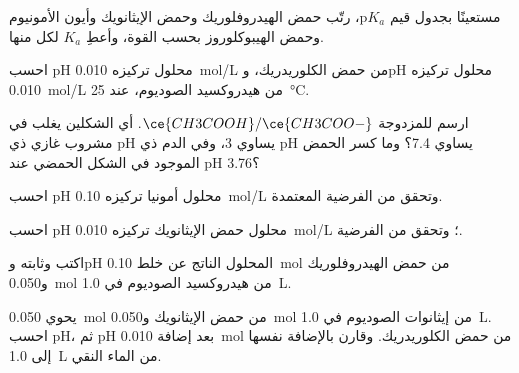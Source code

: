 \begin{exercise}[$\star$]\label{exo:b1:predominant-reaction:2}
مستعينًا بجدول قيم $\mathrm{p}K_a$، رتّب حمض الهيدروفلوريك وحمض الإيثانويك
وأيون الأمونيوم وحمض الهيبوكلوروز بحسب القوة، وأعطِ $K_a$ لكل
منها.
\end{exercise}

\begin{exercise}[$\star$]\label{exo:b1:predominant-reaction:3}
احسب pH محلول تركيزه \qty{0.010}{mol/L} من حمض الكلوريدريك،
وpH محلول تركيزه \qty{0.010}{mol/L} من هيدروكسيد الصوديوم، عند
\qty{25}{\celsius}.
\end{exercise}

\begin{exercise}[$\star$]\label{exo:b1:predominant-reaction:4}
ارسم  للمزدوجة $\ce{CH3COOH}/\ce{CH3COO-}$.
أي الشكلين يغلب في مشروب غازي ذي pH يساوي 3، وفي الدم ذي pH يساوي 7.4؟ وما
كسر الحمض الموجود في الشكل الحمضي عند pH 3.76؟
\end{exercise}

\begin{exercise}[$\star\star$]\label{exo:b1:predominant-reaction:5}
احسب pH محلول أمونيا تركيزه \qty{0.10}{mol/L} وتحقق من
الفرضية المعتمدة.
\end{exercise}

\begin{exercise}[$\star\star$]\label{exo:b1:predominant-reaction:6}
احسب pH محلول حمض الإيثانويك تركيزه \qty{0.010}{mol/L}
؛ وتحقق من الفرضية.
\end{exercise}

\begin{exercise}[$\star\star$]\label{exo:b1:predominant-reaction:7}
اكتب  وثابته وpH المحلول
الناتج عن خلط \qty{0.10}{mol} من حمض الهيدروفلوريك
و\qty{0.050}{mol} من هيدروكسيد الصوديوم في \qty{1.0}{L}.
\end{exercise}

\begin{exercise}[$\star\star$]\label{exo:b1:predominant-reaction:8}
يحوي  \qty{0.050}{mol} من حمض الإيثانويك و\qty{0.050}{mol}
من إيثانوات الصوديوم في \qty{1.0}{L}. احسب pH، ثم pH بعد
إضافة \qty{0.010}{mol} من حمض الكلوريدريك. وقارن بالإضافة نفسها
إلى \qty{1.0}{L} من الماء النقي.
\end{exercise}

